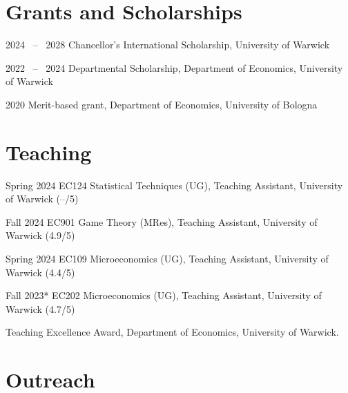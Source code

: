 \documentclass[11pt,a4paper]{article}
\begin{document}


\section{Grants and Scholarships}

\begin{cvenumerate}
    \item[2024 \ -- \ 2028] Chancellor's International Scholarship, University of Warwick
    \item[2022 \ -- \ 2024] Departmental Scholarship, Department of Economics, University of Warwick
    \item[2020] Merit-based grant, Department of Economics, University of Bologna
\end{cvenumerate}

\section{Teaching}

\begin{cvenumerate}
    \item[Spring 2024] EC124 Statistical Techniques (UG), Teaching Assistant, University of Warwick (--/5)
    \item[Fall 2024] EC901 Game Theory (MRes), Teaching Assistant, University of Warwick (4.9/5)
    \item[Spring 2024] EC109 Microeconomics (UG), Teaching Assistant, University of Warwick (4.4/5)
    \item[Fall 2023*] EC202 Microeconomics (UG), Teaching Assistant, University of Warwick (4.7/5)
\end{cvenumerate}
\vspace{-10pt}
{\small*Teaching Excellence Award, Department of Economics, University of Warwick.}

\section{Outreach}
\end{document}
